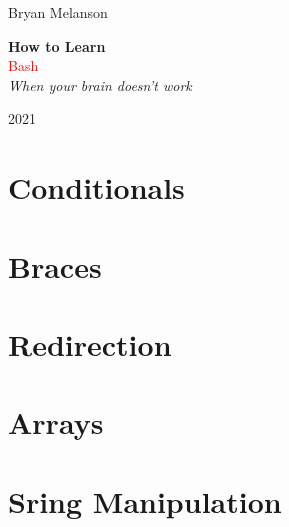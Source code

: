 \documentclass[11pt]{article}
\newcommand*{\plogo}{\fbox{$\mathcal{BM}$}}
\begin{document}
 
        
    \begin{titlepage}
    
        \raggedleft
        
        \vspace*{\baselineskip}
        
        {\Large Bryan Melanson}
        
        \vspace*{0.167\textheight}
        
        \textbf{\LARGE How to Learn}\\[\baselineskip]
        
        {\textcolor{Red}{\Huge Bash }}\\[\baselineskip]
        
        {\Large \textit{When your brain doesn't work}}
        
        \vfill
        
        {\large 2021 ~~\plogo}
        
        \vspace*{3\baselineskip}
    
    \end{titlepage}

    \pagebreak
    
    
    \tableofcontents
    \pagebreak
\section{Conditionals}

\section{Braces}

\section{Redirection}

\section{Arrays}

\section{Sring Manipulation}

\end{document}
